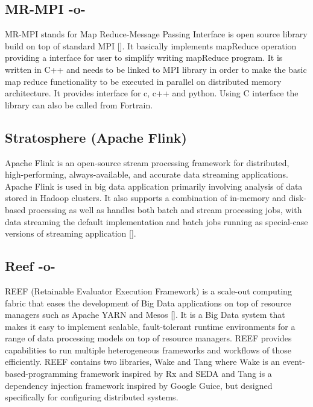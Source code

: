 \subsection{MR-MPI -o-}

MR-MPI stands for Map Reduce-Message Passing Interface is open source
library build on top of standard MPI [\cite{www-mapreducempi}]. It
basically implements mapReduce operation providing a interface for
user to simplify writing mapReduce program.  It is written in C++ and
needs to be linked to MPI library in order to make the basic map
reduce functionality to be executed in parallel on distributed memory
architecture.  It provides interface for c, c++ and python. Using C
interface the library can also be called from Fortrain.



\subsection{Stratosphere (Apache Flink)}
     
Apache Flink is an open-source stream processing framework for
distributed, high-performing, always-available, and accurate data
streaming applications. Apache Flink is used in big data application
primarily involving analysis of data stored in Hadoop clusters.  It
also supports a combination of in-memory and disk-based processing as
well as handles both batch and stream processing jobs, with data
streaming the default implementation and batch jobs running as
special-case versions of streaming application [\cite{www-flink}].


\subsection{Reef -o-}

REEF (Retainable Evaluator Execution Framework) is a scale-out
computing fabric that eases the development of Big Data applications
on top of resource managers such as Apache YARN and
Mesos [\cite{www-reef}]. It is a Big Data system that makes it easy to
implement scalable, fault-tolerant runtime environments for a range of
data processing models on top of resource managers. REEF provides
capabilities to run multiple heterogeneous frameworks and workflows of
those efficiently. REEF contains two libraries, Wake and Tang where
Wake is an event-based-programming framework inspired by Rx and SEDA
and Tang is a dependency injection framework inspired by Google Guice,
but designed specifically for configuring distributed systems.




